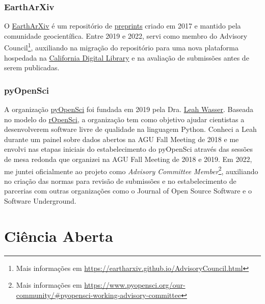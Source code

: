 \documentclass[10pt,a4paper,oneside]{book}
\begin{document}
\subsection{EarthArXiv}

O \href{https://eartharxiv.org/}{EarthArXiv} é um repositório de
\href{https://en.wikipedia.org/wiki/Preprint}{preprints} criado em 2017 e
mantido pela comunidade geocientífica.
Entre 2019 e 2022, servi como membro do
Advisory Council\footnote{Mais informações em \url{https://eartharxiv.github.io/AdvisoryCouncil.html}},
auxiliando na migração do repositório para uma nova plataforma hospedada na
\href{https://cdlib.org/}{California Digital Library} e na avaliação de
submissões antes de serem publicadas.

\subsection{pyOpenSci}

A organização \href{https://www.pyopensci.org/}{pyOpenSci} foi fundada em
2019 pela Dra. \href{https://www.leahwasser.com}{Leah Wasser}.
Baseada no modelo do \href{https://ropensci.org/}{rOpenSci}, a organização tem
como objetivo ajudar cientistas a desenvolverem software livre de qualidade na
linguagem Python.
Conheci a Leah durante um painel sobre dados abertos na AGU Fall Meeting de
2018 e me envolvi nas etapas iniciais do estabelecimento do pyOpenSci através
das sessões de mesa redonda que organizei na AGU Fall Meeting de 2018 e 2019.
Em 2022, me juntei oficialmente ao projeto como
\textit{Advisory Committee Member}\footnote{Mais informações em
\url{https://www.pyopensci.org/our-community/\#pyopensci-working-advisory-committee}},
auxiliando no criação das normas para revisão de submissões e no estabelecimento
de parcerias com outras organizações como o Journal of Open Source Software e
o Software Underground.


\chapter{Ciência Aberta}
\label{cap_cienciaaberta}
\end{document}
